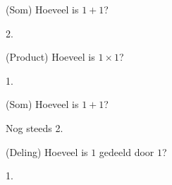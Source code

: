 \documentclass{kleineproblemen}
\begin{document}

\begin{opgave}(Som)
Hoeveel is $1+1$?
\begin{antwoord}
2.
\end{antwoord}
\end{opgave}

\begin{opgave}(Product)
Hoeveel is $1\times 1$?
\begin{antwoord}
1.
\end{antwoord}
\end{opgave}



\begin{opgave}(Som)
Hoeveel is $1+1$?
\begin{antwoord}
Nog steeds 2.
\end{antwoord}
\end{opgave}


\begin{opgave}(Deling)
Hoeveel is $1$ gedeeld door $1$?
\begin{antwoord}
1.
\end{antwoord}
\end{opgave}


\toonantwoorden
\end{document}
